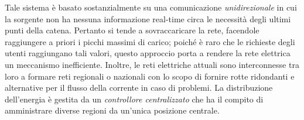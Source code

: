 \newline Tale sistema è basato sostanzialmente su una comunicazione \textit{unidirezionale} in cui la sorgente non ha nessuna informazione real-time circa le necessità degli ultimi punti della catena. Pertanto si tende a sovraccaricare la rete, facendole raggiungere a priori i picchi massimi di carico; poiché è raro che le richieste degli utenti raggiungano tali valori, questo approccio porta a rendere la rete elettrica un meccanismo inefficiente.
\newline
Inoltre, le reti elettriche attuali sono interconnesse tra loro a formare reti regionali o nazionali con lo scopo di fornire rotte ridondanti e alternative per il flusso della corrente in caso di problemi. \newline
La distribuzione dell'energia è gestita da un \textit{controllore centralizzato} che ha il compito di amministrare diverse regioni da un'unica posizione centrale. 

